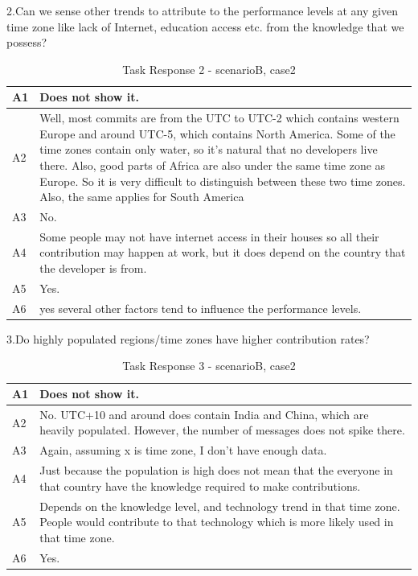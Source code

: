 \documentclass[seploa]{beavtex}
\begin{document}
2.Can we sense other trends to attribute to the performance levels at any given time zone like lack of Internet, education access etc. from the knowledge that we possess?	

\begin{table}[H]
\begin{tabular}{ |p{2cm}|p{12cm}| }
 \hline
 A1 & Does not show it.\\
 \hline
 A2 & Well, most commits are from the UTC to UTC-2 which contains western Europe and around UTC-5, which contains North America. Some of the time zones contain only water, so it's natural that no developers live there. Also, good parts of Africa are also under the same time zone as Europe. So it is very difficult to distinguish between these two time zones. Also, the same applies for South America\\ \hline
 A3 & No.\\ \hline
 A4 & Some people may not have internet access in their houses so all their contribution may happen at work, but it does depend on the country that the developer is from.\\ \hline
 A5 & Yes.\\ \hline
 A6 & yes several other factors tend to influence the performance levels.\\
 \hline
\end{tabular}
\caption{Task Response 2 - scenarioB, case2}
\label{tab:table32}
\end{table}


3.Do highly populated regions/time zones have higher contribution rates?	

\begin{table}[H]
\begin{tabular}{ |p{2cm}|p{12cm}| }
 \hline
 A1 & Does not show it.\\ \hline
 A2 & No. UTC+10 and around does contain India and China, which are heavily populated. However, the number of messages does not spike there.\\ \hline
 A3 & Again, assuming x is time zone, I don't have enough data.\\ \hline
 A4 & Just because the population is high does not mean that the everyone in that country have the knowledge required to make contributions.\\ \hline
 A5 & Depends on the knowledge level, and technology trend in that time zone. People would contribute to that technology which is more likely used in that time zone.\\ \hline
 A6 & Yes.\\
 \hline
\end{tabular}
\caption{Task Response 3 - scenarioB, case2}
\label{tab:table33}
\end{table}
\end{document}
